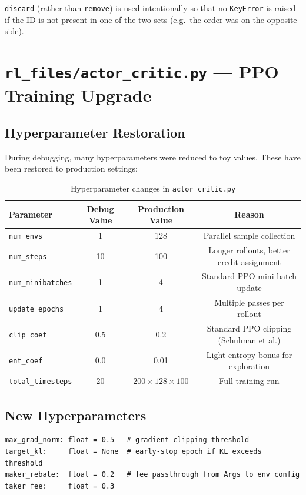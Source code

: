 \documentclass[11pt,a4paper]{article}
\begin{document}
\texttt{discard} (rather than \texttt{remove}) is used intentionally so
that no \texttt{KeyError} is raised if the ID is not present in one of
the two sets (e.g.\ the order was on the opposite side).

\section{\texttt{rl\_files/actor\_critic.py} — PPO Training Upgrade}

\subsection{Hyperparameter Restoration}

During debugging, many hyperparameters were reduced to toy values.
These have been restored to production settings:

\begin{table}[h!]
\centering
\renewcommand{\arraystretch}{1.3}
\begin{tabular}{lccc}
\toprule
\textbf{Parameter} & \textbf{Debug Value} & \textbf{Production Value} & \textbf{Reason} \\
\midrule
\texttt{num\_envs}       & 1    & 128  & Parallel sample collection \\
\texttt{num\_steps}      & 10   & 100  & Longer rollouts, better credit assignment \\
\texttt{num\_minibatches}& 1    & 4    & Standard PPO mini-batch update \\
\texttt{update\_epochs}  & 1    & 4    & Multiple passes per rollout \\
\texttt{clip\_coef}      & 0.5  & 0.2  & Standard PPO clipping (Schulman et al.) \\
\texttt{ent\_coef}       & 0.0  & 0.01 & Light entropy bonus for exploration \\
\texttt{total\_timesteps}& 20   & $200\times128\times100$ & Full training run \\
\bottomrule
\end{tabular}
\caption{Hyperparameter changes in \texttt{actor\_critic.py}}
\end{table}

\subsection{New Hyperparameters}

\begin{lstlisting}
max_grad_norm: float = 0.5   # gradient clipping threshold
target_kl:     float = None  # early-stop epoch if KL exceeds threshold
maker_rebate:  float = 0.2   # fee passthrough from Args to env config
taker_fee:     float = 0.3
\end{lstlisting}
\end{document}
